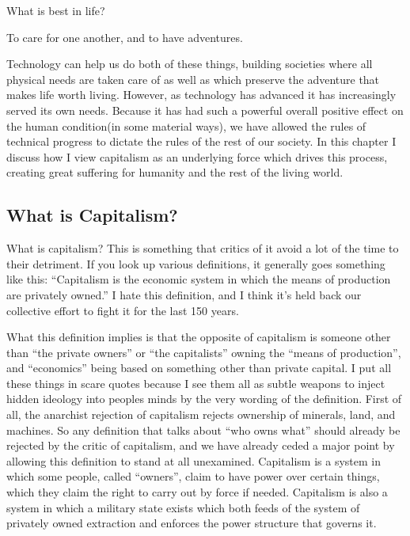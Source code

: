 What is best in life?

To care for one another, and to have adventures.

Technology can help us do both of these things, building societies where
all physical needs are taken care of as well as which preserve the
adventure that makes life worth living. However, as technology has
advanced it has increasingly served its own needs. Because it has had
such a powerful overall positive effect on the human condition(in some
material ways), we have allowed the rules of technical progress to
dictate the rules of the rest of our society. In this chapter I discuss
how I view capitalism as an underlying force which drives this process,
creating great suffering for humanity and the rest of the living world.

\subsection{What is Capitalism?}\label{what-is-capitalism}

What is capitalism? This is something that critics of it avoid a lot of
the time to their detriment. If you look up various definitions, it
generally goes something like this: ``Capitalism is the economic system
in which the means of production are privately owned.'' I hate this
definition, and I think it's held back our collective effort to fight it
for the last 150 years.

What this definition implies is that the opposite of capitalism is
someone other than ``the private owners'' or ``the capitalists'' owning
the ``means of production'', and ``economics'' being based on something
other than private capital. I put all these things in scare quotes
because I see them all as subtle weapons to inject hidden ideology into
peoples minds by the very wording of the definition. First of all, the
anarchist rejection of capitalism rejects ownership of minerals, land,
and machines. So any definition that talks about ``who owns what''
should already be rejected by the critic of capitalism, and we have
already ceded a major point by allowing this definition to stand at all
unexamined. Capitalism is a system in which some people, called
``owners'', claim to have power over certain things, which they claim
the right to carry out by force if needed. Capitalism is also a system
in which a military state exists which both feeds of the system of
privately owned extraction and enforces the power structure that governs
it.

